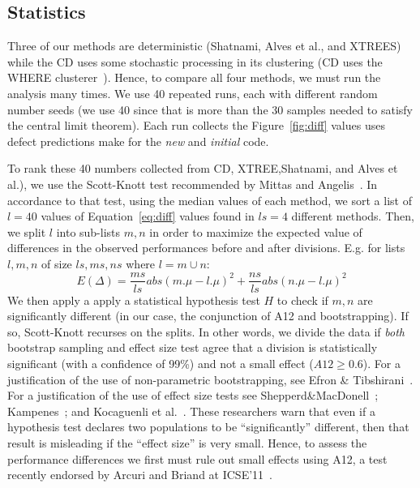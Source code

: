 \documentclass{sig-alternate}
\newcommand{\fig}[1]{Figure~\ref{fig:#1}}
\newcommand{\eq}[1]{Equation~\ref{eq:#1}}
\begin{document}
\begin{itemize}
\subsection{Statistics}
Three of our methods are deterministic (Shatnami, Alves et al.,
and XTREES) while the CD uses some stochastic processing
in its clustering (CD uses the  WHERE clusterer~\cite{Menzies2013:local}). Hence, to compare all
four methods, we must run the analysis many times. 
We use  40 repeated runs, each with different random number seeds (we use 40 since that is  more than the 30 samples  needed to satisfy the central limit theorem). Each run collects the \fig{diff} values
uses defect predictions make for the {\em new} and {\em initial} code.

To rank these 40 numbers collected from CD, XTREE,Shatnami, and Alves et al.), we  use the Scott-Knott test recommended by Mittas and Angelis~\cite{mittas13}. 
In accordance to that test, using the median values of each method, we
sort a list of  $l=40$ values of \eq{diff} values found in  $ls=4$ different methods. 
Then, we split $l$ into sub-lists $m,n$ in order to maximize the expected value of differences  in the observed performances before and after divisions. E.g. for lists $l,m,n$ of size $ls,ms,ns$ where $l=m\cup n$: \[E(\Delta)=\frac{ms}{ls}abs(m.\mu - l.\mu)^2 + \frac{ns}{ls}abs(n.\mu - l.\mu)^2\]
We then apply a apply a statistical hypothesis test $H$ to check
if $m,n$ are significantly different  (in our case, the conjunction of A12 and bootstrapping). If so, Scott-Knott recurses on the splits. In other words, we divide the data if \textit{both} bootstrap sampling and effect size test agree that a division is statistically significant (with a confidence of 99\%) and not a small effect ($A12 \ge 0.6$).
For a justification of the use of non-parametric bootstrapping, see Efron \& Tibshirani~\cite[p220-223]{efron93}. For a justification of the use of effect size tests see Shepperd\&MacDonell~\cite{shepperd12a}; Kampenes~\cite{kampenes07}; and Kocaguenli et al.~\cite{Kocaguneli2013:ep}. These researchers warn that even if a hypothesis test declares two populations to be ``significantly'' different, then that result is misleading if the ``effect size'' is very small. Hence, to assess the performance differences we first must rule out small effects using A12, a test   recently endorsed by Arcuri and Briand at ICSE'11~\cite{arcuri11}.


\end{itemize}
\end{document}
